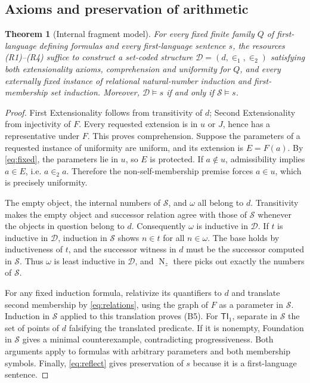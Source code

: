 \documentclass[11pt,a4paper]{article}
\numberwithin{equation}{section}
\newtheorem{theorem}{Theorem}[section]
\theoremstyle{definition}
\theoremstyle{remark}
\newcommand{\TI}{\mathsf{TI}_1}
\newcommand{\Nat}{\operatorname{N}}
\newcommand{\extone}{\in_1}
\newcommand{\exttwo}{\in_2}
\begin{document}
\subsection{Axioms and preservation of arithmetic}\label{sec:verifyfrag}
\begin{theorem}[Internal fragment model]\label{thm:fragment}
For every fixed finite family $Q$ of first-language defining formulas and every first-language sentence $s$, the resources (R1)--(R4) suffice to construct a set-coded structure $\mathcal D=(d,\extone,\exttwo)$ satisfying both extensionality axioms, comprehension and uniformity for $Q$, and every externally fixed instance of relational natural-number induction and first-membership set induction. Moreover, $\mathcal D\models s$ if and only if $\mathcal S\models s$.
\end{theorem}
\begin{proof}
First Extensionality follows from transitivity of $d$; Second Extensionality from injectivity of $F$. Every requested extension is in $u$ or $J$, hence has a representative under $F$. This proves comprehension. Suppose the parameters of a requested instance of uniformity are uniform, and its extension is $E=F(a)$. By \eqref{eq:fixed}, the parameters lie in $u$, so $E$ is protected. If $a\notin u$, admissibility implies $a\in E$, i.e. $a\exttwo a$. Therefore the non-self-membership premise forces $a\in u$, which is precisely uniformity.

The empty object, the internal numbers of $\mathcal S$, and $\omega$ all belong to $d$. Transitivity makes the empty object and successor relation agree with those of $\mathcal S$ whenever the objects in question belong to $d$. Consequently $\omega$ is inductive in $\mathcal D$. If $t$ is inductive in $\mathcal D$, induction in $\mathcal S$ shows $n\in t$ for all $n\in\omega$. The base holds by inductiveness of $t$, and the successor witness in $d$ must be the successor computed in $\mathcal S$. Thus $\omega$ is least inductive in $\mathcal D$, and $\Nat_z$ there picks out exactly the numbers of $\mathcal S$.

For any fixed induction formula, relativize its quantifiers to $d$ and translate second membership by \eqref{eq:relations}, using the graph of $F$ as a parameter in $\mathcal S$. Induction in $\mathcal S$ applied to this translation proves (B5). For $\TI$, separate in $\mathcal S$ the set of points of $d$ falsifying the translated predicate. If it is nonempty, Foundation in $\mathcal S$ gives a minimal counterexample, contradicting progressiveness. Both arguments apply to formulas with arbitrary parameters and both membership symbols. Finally, \eqref{eq:reflect} gives preservation of $s$ because it is a first-language sentence.
\end{proof}
\end{document}
